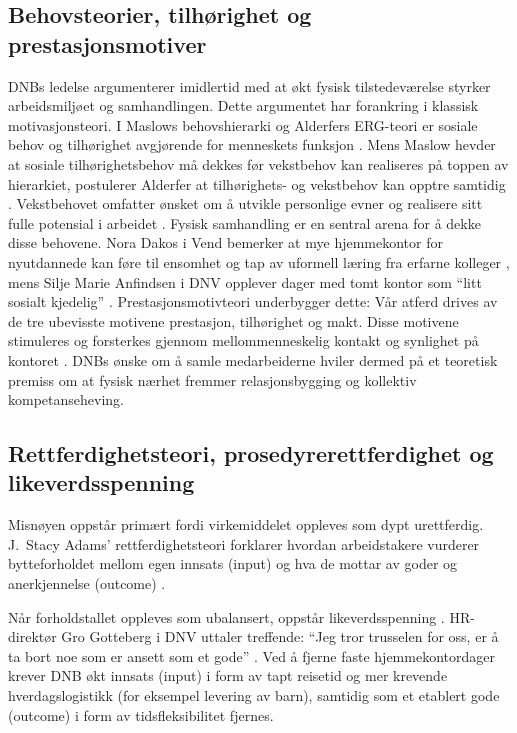 \subsection{Behovsteorier, tilhørighet og prestasjonsmotiver}

DNBs ledelse argumenterer imidlertid med at økt fysisk tilstedeværelse styrker arbeidsmiljøet og samhandlingen. Dette argumentet har forankring i klassisk motivasjonsteori. I Maslows behovshierarki og Alderfers ERG-teori er sosiale behov og tilhørighet avgjørende for menneskets funksjon \parencite[s.~97--98]{nerstad2023}. Mens Maslow hevder at sosiale tilhørighetsbehov må dekkes før vekstbehov kan realiseres på toppen av hierarkiet, postulerer Alderfer at tilhørighets- og vekstbehov kan opptre samtidig \parencite[s.~97--98]{nerstad2023}. Vekstbehovet omfatter ønsket om å utvikle personlige evner og realisere sitt fulle potensial i arbeidet \parencite[s.~97--98]{nerstad2023}. Fysisk samhandling er en sentral arena for å dekke disse behovene. Nora Dakos i Vend bemerker at mye hjemmekontor for nyutdannede kan føre til ensomhet og tap av uformell læring fra erfarne kolleger \parencite{ingebrigtsen_vend_2026}, mens Silje Marie Anfindsen i DNV opplever dager med tomt kontor som \enquote{litt sosialt kjedelig} \parencite{ingebrigtsen_dnv_2026}. Prestasjonsmotivteori underbygger dette: Vår atferd drives av de tre ubevisste motivene prestasjon, tilhørighet og makt. Disse motivene stimuleres og forsterkes gjennom mellommenneskelig kontakt og synlighet på kontoret \parencite[s.~100]{nerstad2023}. DNBs ønske om å samle medarbeiderne hviler dermed på et teoretisk premiss om at fysisk nærhet fremmer relasjonsbygging og kollektiv kompetanseheving.

\subsection{Rettferdighetsteori, prosedyrerettferdighet og likeverdsspenning}

Misnøyen oppstår primært fordi virkemiddelet oppleves som dypt urettferdig. J.~Stacy Adams' rettferdighetsteori forklarer hvordan arbeidstakere vurderer bytteforholdet mellom egen innsats (input) og hva de mottar av goder og anerkjennelse (outcome) \parencite[s.~105]{nerstad2023}.

Når forholdstallet oppleves som ubalansert, oppstår likeverdsspenning \parencite[s.~105]{nerstad2023}. HR-direktør Gro Gotteberg i DNV uttaler treffende: \enquote{Jeg tror trusselen for oss, er å ta bort noe som er ansett som et gode} \parencite{ingebrigtsen_dnv_2026}. Ved å fjerne faste hjemmekontordager krever DNB økt innsats (input) i form av tapt reisetid og mer krevende hverdagslogistikk (for eksempel levering av barn), samtidig som et etablert gode (outcome) i form av tidsfleksibilitet fjernes.

